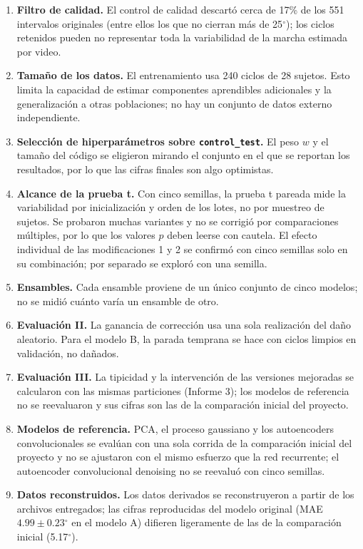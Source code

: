 \documentclass[11pt,a4paper]{article}
\newcommand{\gr}{$^{\circ}$}
\begin{document}
\begin{enumerate}
\item \textbf{Filtro de calidad.} El control de calidad descartó cerca de 17\% de los 551 intervalos originales (entre ellos los que no cierran más de 25\gr{}); los ciclos retenidos pueden no representar toda la variabilidad de la marcha estimada por video.
\item \textbf{Tamaño de los datos.} El entrenamiento usa 240 ciclos de 28 sujetos. Esto limita la capacidad de estimar componentes aprendibles adicionales y la generalización a otras poblaciones; no hay un conjunto de datos externo independiente.
\item \textbf{Selección de hiperparámetros sobre \texttt{control\_test}.} El peso $w$ y el tamaño del código se eligieron mirando el conjunto en el que se reportan los resultados, por lo que las cifras finales son algo optimistas.
\item \textbf{Alcance de la prueba t.} Con cinco semillas, la prueba t pareada mide la variabilidad por inicialización y orden de los lotes, no por muestreo de sujetos. Se probaron muchas variantes y no se corrigió por comparaciones múltiples, por lo que los valores $p$ deben leerse con cautela. El efecto individual de las modificaciones 1 y 2 se confirmó con cinco semillas solo en su combinación; por separado se exploró con una semilla.
\item \textbf{Ensambles.} Cada ensamble proviene de un único conjunto de cinco modelos; no se midió cuánto varía un ensamble de otro.
\item \textbf{Evaluación II.} La ganancia de corrección usa una sola realización del daño aleatorio. Para el modelo B, la parada temprana se hace con ciclos limpios en validación, no dañados.
\item \textbf{Evaluación III.} La tipicidad y la intervención de las versiones mejoradas se calcularon con las mismas particiones (Informe 3); los modelos de referencia no se reevaluaron y sus cifras son las de la comparación inicial del proyecto.
\item \textbf{Modelos de referencia.} PCA, el proceso gaussiano y los autoencoders convolucionales se evalúan con una sola corrida de la comparación inicial del proyecto y no se ajustaron con el mismo esfuerzo que la red recurrente; el autoencoder convolucional denoising no se reevaluó con cinco semillas.
\item \textbf{Datos reconstruidos.} Los datos derivados se reconstruyeron a partir de los archivos entregados; las cifras reproducidas del modelo original (MAE $4.99\pm0.23$\gr{} en el modelo A) difieren ligeramente de las de la comparación inicial (5.17\gr{}).

\end{enumerate}
\end{document}
